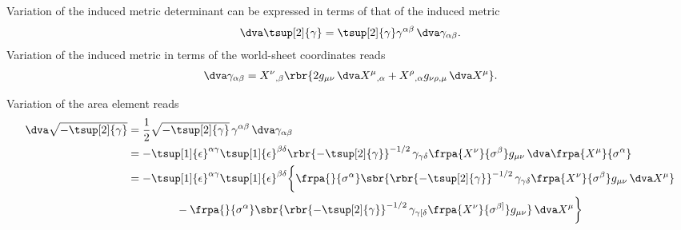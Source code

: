 \documentclass[a4paper,11pt]{article}
\begin{document}
Variation of the induced metric determinant can be expressed in terms of that 
of the induced metric
\begin{align}
\dva \tsup[2]{\gamma} = \tsup[2]{\gamma} \gamma^{\alpha\beta}\,\dva 
	\gamma_{\alpha\beta}.
\end{align}
Variation of the induced metric in terms of the world-sheet coordinates reads 
\begin{align}
\dva \gamma_{\alpha\beta} = X^{\nu}{}_{,\beta} \rbr{
	2 g_{\mu\nu}\, 	\dva X^{\mu}{}_{,\alpha} + 
	X^{\rho}{}_{,\alpha} g_{\nu\rho,\mu}\, \dva X^{\mu}}.
\end{align}


Variation of the area element reads
\begin{align}
\dva \sqrt{-\tsup[2]{\gamma}} &=
\frac{1}{2} \sqrt{-\tsup[2]{\gamma}}\, \gamma^{\alpha\beta}\,
\dva \gamma_{\alpha\beta}
\nonumber \\
&=
-\tsup[1]{\epsilon}^{\alpha\gamma} \tsup[1]{\epsilon}^{\beta\delta} 
	\rbr{-\tsup[2]{\gamma}}^{-1/2}\, \gamma_{\gamma\delta}
	\frpa{X^{\nu}}{\sigma^{\beta}}
	g_{\mu\nu}\, \dva\frpa{X^{\mu}}{\sigma^{\alpha}} 
\nonumber \\
&=
-\tsup[1]{\epsilon}^{\alpha\gamma} \tsup[1]{\epsilon}^{\beta\delta} 
	\bigg\{\frpa{}{\sigma^{\alpha}}
		\sbr{\rbr{-\tsup[2]{\gamma}}^{-1/2}\, 
		\gamma_{\gamma\delta}\frpa{X^{\nu}}{\sigma^{\beta}} g_{\mu\nu}\, 
		\dva X^{\mu}}
\nonumber \\
&\qquad\qquad\ -
\frpa{}{\sigma^{\alpha}}
	\sbr{\rbr{-\tsup[2]{\gamma}}^{-1/2}\, 
		\gamma_{\gamma[\delta} \frpa{X^{\nu}}{\sigma^{\beta]}} g_{\mu\nu}}\, 
		\dva X^{\mu}
	\bigg\}
\end{align}



\printbibliography
\end{document}
